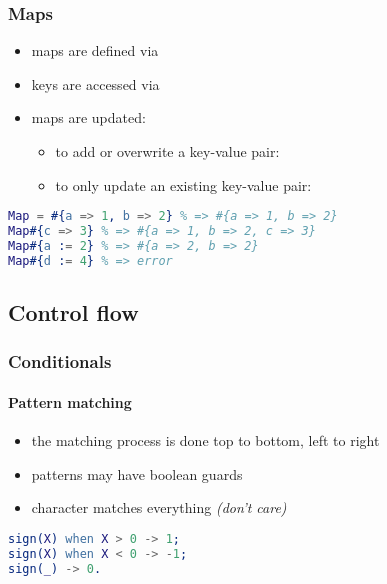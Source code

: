 \documentclass[a4paper,landscape,10pt]{article}
\begin{document}
\begin{multicols*}{2}
  \subsubsection{Maps}

  \begin{itemize}
    \item maps are defined via 
    \item keys are accessed via 
    \item maps are updated:
          \begin{itemize}
            \item to add or overwrite a key-value pair: 
            \item to only update an existing key-value pair: 
          \end{itemize}
  \end{itemize}

  \begin{lstlisting}[language=Erlang]
Map = #{a => 1, b => 2} % => #{a => 1, b => 2}
Map#{c => 3} % => #{a => 1, b => 2, c => 3}
Map#{a := 2} % => #{a => 2, b => 2}
Map#{d := 4} % => error
\end{lstlisting}

  \subsection{Control flow}

  \subsubsection{Conditionals}

  \paragraph{Pattern matching}

  \begin{itemize}
    \item the matching process is done top to bottom, left to right
    \item patterns may have boolean guards
    \item character \ierlang{_} matches everything \textit{(don't care)}
  \end{itemize}

  \begin{lstlisting}[language=Erlang]
sign(X) when X > 0 -> 1;
sign(X) when X < 0 -> -1;
sign(_) -> 0.
  \end{lstlisting}


\end{multicols*}
\end{document}
